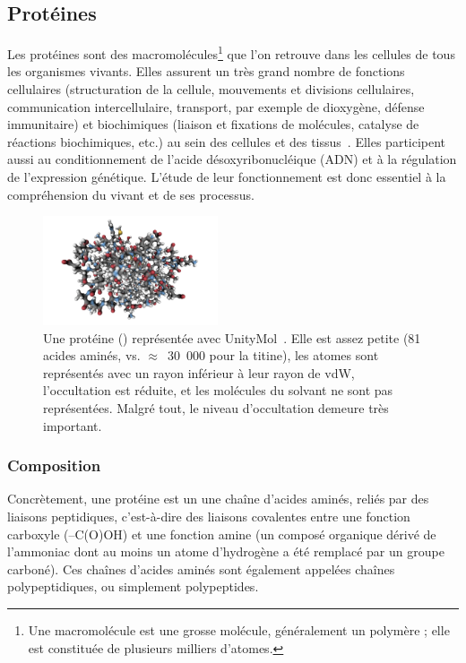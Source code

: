 	\FloatBarrier \subsection{Protéines}
	Les protéines sont des macromolécules\footnote{Une macromolécule est une \og grosse \fg{} molécule, généralement un polymère ; elle est constituée de plusieurs milliers d'atomes.} que l'on retrouve dans les cellules de tous les organismes vivants. Elles assurent un très grand nombre de fonctions cellulaires (structuration de la cellule, mouvements et divisions cellulaires, communication intercellulaire, transport, par exemple de dioxygène, défense immunitaire) et biochimiques (liaison et fixations de molécules, catalyse de réactions biochimiques, etc.) au sein des cellules et des tissus~\cite{lodish2004molecular}. Elles participent aussi au conditionnement de l'acide désoxyribonucléique (ADN) et à la régulation de l'expression génétique. L'étude de leur fonctionnement est donc essentiel à la compréhension du vivant et de ses processus.
	
	\begin{figure} %
		\centering
		\includegraphics[width=0.46\textwidth]{figures/ch1/1KX2}
		\caption[Une protéine en \emph{Hyperballs}]{Une protéine (\cite{bartalesi2002solution}) représentée avec UnityMol~\cite{doutreligne2014unitymol}. Elle est assez petite (81 acides aminés, vs. $\approx$~30~000 pour la titine), les atomes sont représentés avec un rayon inférieur à leur rayon de vdW, l'occultation est réduite, et les molécules du solvant ne sont pas représentées. Malgré tout, le niveau d'occultation demeure très important.}
		\label{fig:1KX2}
	\end{figure}
	
	\subsubsection{Composition}
	Concrètement, une protéine est un une  chaîne d'acides aminés, reliés par des liaisons peptidiques, c'est-à-dire des liaisons covalentes entre une fonction carboxyle (–C(O)OH) et une fonction amine (un composé organique dérivé de l'ammoniac dont au moins un atome d'hydrogène a été remplacé par un groupe carboné). Ces chaînes d'acides aminés sont également appelées chaînes polypeptidiques, ou simplement polypeptides.
	
